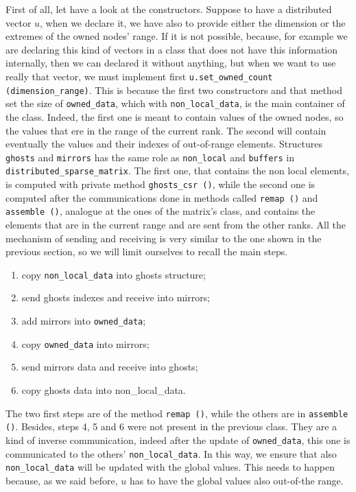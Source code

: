 First of all, let have a look at the constructors. Suppose to have a distributed vector $ u $, when we declare it, we have also to provide either the dimension or the extremes of the owned nodes' range. If it is not possible, because, for example we are declaring this kind of vectors in a class that does not have this information internally, then we can declared it without anything, but when we want to use really that vector, we must implement first \texttt{u.set\_owned\_count (dimension\_range)}. This is because the first two constructors and that method set the size of \texttt{owned\_data}, which with \texttt{non\_local\_data}, is the main container of the class. Indeed, the first one is meant to contain values of the owned nodes, so the values that ere in the range of the current rank. The second will contain eventually the values and their indexes of out-of-range elements. Structures \texttt{ghosts} and \texttt{mirrors} has the same role as \texttt{non\_local} and \texttt{buffers} in \texttt{distributed\_sparse\_matrix}. The first one, that contains the non local elements, is computed  with private method \texttt{ghosts\_csr ()}, while the second one is computed after the communications done in methods called \texttt{remap ()} and \texttt{assemble ()}, analogue at the ones of the matrix's class, and contains the elements that are in the current range and are sent from the other ranks. All the mechanism of sending and receiving is very similar to the one shown in the previous section, so we will limit ourselves to recall the main steps. 
\begin{enumerate}
	\item  copy \texttt{non\_local\_data} into ghosts structure;
	\item  send ghosts indexes and receive into mirrors;
	\item add mirrors into \texttt{owned\_data};
	\item copy \texttt{owned\_data} into mirrors;
	\item send mirrors data and receive into ghosts;
	\item copy ghosts data into non\_local\_data.
\end{enumerate}
The two first steps are of the method \texttt{remap ()}, while the others are in \texttt{assemble ()}. Besides, steps 4, 5 and 6 were not present in the previous class. They are a kind of inverse communication, indeed after the update of \texttt{owned\_data}, this one is communicated to the others' \texttt{non\_local\_data}. In this way, we ensure that also \texttt{non\_local\_data} will be updated with the global values. This needs to happen because, as we said before, $ u $ has to have the global values also out-of-the range.\\
